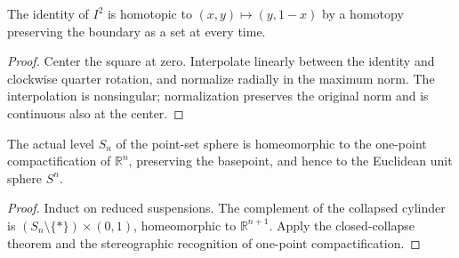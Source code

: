 \begin{proposition}
  \label{prop:cube-quarter-rotation}
  \leanok
  The identity of $I^2$ is homotopic to $(x,y)\mapsto(y,1-x)$ by
  a homotopy preserving the boundary as a set at every time.
\end{proposition}
\begin{proof}
  Center the square at zero. Interpolate linearly between the identity
  and clockwise quarter rotation, and normalize radially in the maximum
  norm. The interpolation is nonsingular; normalization preserves the
  original norm and is continuous also at the center.
  \leanok
\end{proof}

\begin{proposition}
  \label{prop:point-set-sphere-geometric-recognition}
  \leanok
  The actual level $S_n$ of the point-set sphere is homeomorphic to
  the one-point compactification of $\mathbb R^n$, preserving the
  basepoint, and hence to the Euclidean unit sphere $S^n$.
\end{proposition}
\begin{proof}
  Induct on reduced suspensions. The complement of the collapsed
  cylinder is $(S_n\setminus\{*\})\times(0,1)$, homeomorphic to
  $\mathbb R^{n+1}$. Apply the closed-collapse theorem and the
  stereographic recognition of one-point compactification.
  \leanok
\end{proof}

